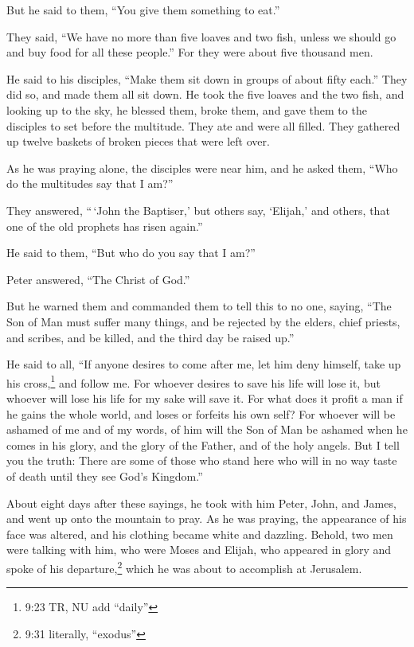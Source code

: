  But he said to them, ``You give them something to eat.''

They said, ``We have no more than five loaves and two fish, unless we
should go and buy food for all these people.''  For they
were about five thousand men.

He said to his disciples, ``Make them sit down in groups of about fifty
each.''  They did so, and made them all sit down.
 He took the five loaves and the two fish, and looking up
to the sky, he blessed them, broke them, and gave them to the disciples
to set before the multitude.  They ate and were all filled.
They gathered up twelve baskets of broken pieces that were left over.

 As he was praying alone, the disciples were near him, and
he asked them, ``Who do the multitudes say that I am?''

 They answered, ``\,`John the Baptiser,' but others say,
`Elijah,' and others, that one of the old prophets has risen again.''

 He said to them, ``But who do you say that I am?''

Peter answered, ``The Christ of God.''

 But he warned them and commanded them to tell this to no
one,  saying, ``The Son of Man must suffer many things, and
be rejected by the elders, chief priests, and scribes, and be killed,
and the third day be raised up.''

 He said to all, ``If anyone desires to come after me, let
him deny himself, take up his cross,\footnote{9:23 TR, NU add ``daily''}
and follow me.  For whoever desires to save his life will
lose it, but whoever will lose his life for my sake will save it.
 For what does it profit a man if he gains the whole world,
and loses or forfeits his own self?  For whoever will be
ashamed of me and of my words, of him will the Son of Man be ashamed
when he comes in his glory, and the glory of the Father, and of the holy
angels.  But I tell you the truth: There are some of those
who stand here who will in no way taste of death until they see God's
Kingdom.''

 About eight days after these sayings, he took with him
Peter, John, and James, and went up onto the mountain to pray.
 As he was praying, the appearance of his face was altered,
and his clothing became white and dazzling.  Behold, two
men were talking with him, who were Moses and Elijah,  who
appeared in glory and spoke of his departure,\footnote{9:31 literally,
  ``exodus''} which he was about to accomplish at Jerusalem.

